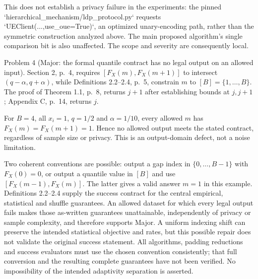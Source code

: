 \documentclass[10pt]{article}
\begin{document}
This does not establish a privacy failure in the experiments: the pinned `hierarchical\_mechanism/ldp\_protocol.py` requests `UEClient(...,use\_oue=True)`, an optimized unary-encoding path, rather than the symmetric construction analyzed above. The main proposed algorithm’s single comparison bit is also unaffected. The scope and severity are consequently local.\par
Problem 4 (Major: the formal quantile contract has no legal output on an allowed input).  Section 2, p. 4, requires \([F_X(m),F_X(m+1)]\) to intersect \((q-\alpha,q+\alpha)\), while Definitions 2.2–2.4, p. 5, constrain \(m\) to \([B]=\{1,\ldots,B\}\). The proof of Theorem 1.1, p. 8, returns \(j+1\) after establishing bounds at \(j,j+1\); Appendix C, p. 14, returns \(j\).\par
For \(B=4\), all \(x_i=1\), \(q=1/2\) and \(\alpha=1/10\), every allowed \(m\) has \(F_X(m)=F_X(m+1)=1\). Hence no allowed output meets the stated contract, regardless of sample size or privacy. This is an output-domain defect, not a noise limitation.\par
Two coherent conventions are possible: output a gap index in \(\{0,\ldots,B-1\}\) with \(F_X(0)=0\), or output a quantile value in \([B]\) and use \([F_X(m-1),F_X(m)]\). The latter gives a valid answer \(m=1\) in this example. Definitions 2.2–2.4 supply the success contract for the central empirical, statistical and shuffle guarantees. An allowed dataset for which every legal output fails makes those as-written guarantees unattainable, independently of privacy or sample complexity, and therefore supports Major. A uniform indexing shift can preserve the intended statistical objective and rates, but this possible repair does not validate the original success statement. All algorithms, padding reductions and success evaluators must use the chosen convention consistently; that full conversion and the resulting complete guarantees have not been verified. No impossibility of the intended adaptivity separation is asserted.\par
\end{document}
